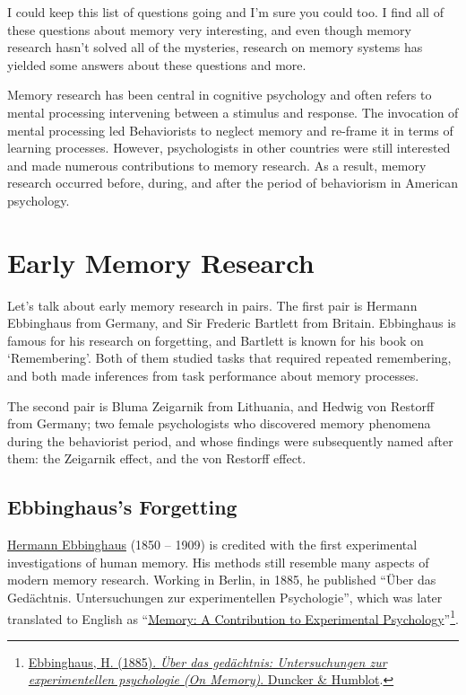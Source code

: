 \documentclass[
  oneside,
  12pt]{crumpbook}
\begin{document}
I could keep this list of questions going and I'm sure you could too. I find all of these questions about memory very interesting, and even though memory research hasn't solved all of the mysteries, research on memory systems has yielded some answers about these questions and more.

Memory research has been central in cognitive psychology and often refers to mental processing intervening between a stimulus and response. The invocation of mental processing led Behaviorists to neglect memory and re-frame it in terms of learning processes. However, psychologists in other countries were still interested and made numerous contributions to memory research. As a result, memory research occurred before, during, and after the period of behaviorism in American psychology.

\hypertarget{early-memory-research}{%
\section{Early Memory Research}\label{early-memory-research}}

Let's talk about early memory research in pairs. The first pair is Hermann Ebbinghaus from Germany, and Sir Frederic Bartlett from Britain. Ebbinghaus is famous for his research on forgetting, and Bartlett is known for his book on `Remembering'. Both of them studied tasks that required repeated remembering, and both made inferences from task performance about memory processes.

The second pair is Bluma Zeigarnik from Lithuania, and Hedwig von Restorff from Germany; two female psychologists who discovered memory phenomena during the behaviorist period, and whose findings were subsequently named after them: the Zeigarnik effect, and the von Restorff effect.

\hypertarget{ebbinghauss-forgetting}{%
\subsection{Ebbinghaus's Forgetting}\label{ebbinghauss-forgetting}}

\href{https://en.wikipedia.org/wiki/Hermann_Ebbinghaus}{Hermann Ebbinghaus} (1850 -- 1909) is credited with the first experimental investigations of human memory. His methods still resemble many aspects of modern memory research. Working in Berlin, in 1885, he published ``Über das Gedächtnis. Untersuchungen zur experimentellen Psychologie'', which was later translated to English as ``\href{https://archive.org/details/memorycontributi00ebbiuoft}{Memory: A Contribution to Experimental Psychology}''\footnote{\protect\hyperlink{ref-ebbinghausUberGedachtnisUntersuchungen1885}{Ebbinghaus, H. (1885). \emph{Über das gedächtnis: Untersuchungen zur experimentellen psychologie ({On Memory})}. {Duncker \& Humblot}}.}.
\end{document}

